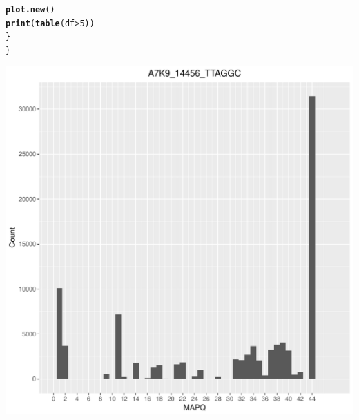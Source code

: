\documentclass[12pt, a4paper]{article}\usepackage[]{graphicx}\usepackage[]{color}
\makeatletter
\def\maxwidth{ %
  \ifdim\Gin@nat@width>\linewidth
    \linewidth
  \else
    \Gin@nat@width
  \fi
}
\newcommand{\hlnum}[1]{\textcolor[rgb]{0.686,0.059,0.569}{#1}}%
\newcommand{\hlopt}[1]{\textcolor[rgb]{0,0,0}{#1}}%
\newcommand{\hlstd}[1]{\textcolor[rgb]{0.345,0.345,0.345}{#1}}%
\newcommand{\hlkwd}[1]{\textcolor[rgb]{0.737,0.353,0.396}{\textbf{#1}}}%
\newenvironment{kframe}{%
 \def\at@end@of@kframe{}%
 \ifinner\ifhmode%
  \def\at@end@of@kframe{\end{minipage}}%
  \begin{minipage}{\columnwidth}%
 \fi\fi%
 \def\FrameCommand##1{\hskip\@totalleftmargin \hskip-\fboxsep
 \colorbox{shadecolor}{##1}\hskip-\fboxsep
     \hskip-\linewidth \hskip-\@totalleftmargin \hskip\columnwidth}%
 \MakeFramed {\advance\hsize-\width
   \@totalleftmargin\z@ \linewidth\hsize
   \@setminipage}}%
 {\par\unskip\endMakeFramed%
 \at@end@of@kframe}
\newenvironment{knitrout}{}{} %
\makeatother
\begin{document}
\begin{knitrout}
\begin{kframe}
\begin{alltt}
    \hlkwd{plot.new}\hlstd{()}
    \hlkwd{print}\hlstd{(}\hlkwd{table}\hlstd{(df} \hlopt{>} \hlnum{5}\hlstd{))}
  \hlstd{\}}
\hlstd{\}}
\end{alltt}
\end{kframe}
\includegraphics[width=\maxwidth]{figure/unnamed-chunk-3-1} 


\end{knitrout}
\end{document}
